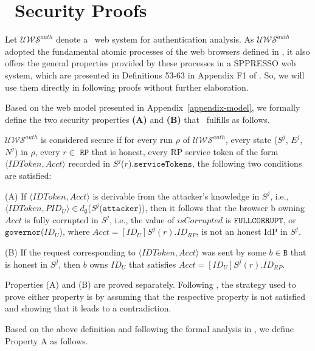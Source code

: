 \section{\usso\ Security Proofs}
\label{appendix-security}

Let  $\mathcal{UWS}^{auth}$ denote a \usso\ web system for authentication analysis. As $\mathcal{UWS}^{auth}$ adopted the fundamental atomic processes of the web browsers defined in \cite{SPRESSO}, it also offers the general properties provided by these processes in a SPPRESSO web system, which are presented in Definitions 53-63 in Appendix F1 of \cite{SPRESSO}. So, we will use them directly in following proofs without further elaboration.

Based on the web model presented in Appendix~\ref{appendix-model}, we formally define the two security properties {\bf (A)} and {\bf (B)} that \usso\ fulfills as follows. 

\begin{definition}
$\mathcal{UWS}^{auth}$ is considered secure if for every run $\rho$ of $\mathcal{UWS}^{auth}$, every state ($S^j$, $E^j$, $N^j$) in $\rho$, every $r \in$ $\mathtt{RP}$ that is honest, every RP service token of the form $\langle IDToken, Acct \rangle$ recorded in $S^j$($r$).$\mathtt{serviceTokens}$, the following two conditions are satisfied:

(A) If $\langle IDToken, Acct\rangle$ is derivable from the attacker's knowledge in $S^j$, i.e., $\langle IDToken, PID_U \rangle \in d_{\emptyset}$($S^j$($\mathtt{attacker}$)), then it follows that the browser b owning $Acct$ is fully corrupted in $S^j$, i.e., the value of $isCorrupted$ is $\mathtt{FULLCORRUPT}$, or $\mathtt{governor}$($ID_U$), where $Acct=[ID_U]S^j(r).ID_{RP}$, is not an honest IdP in $S^j$.

(B) If the request corresponding to $\langle IDToken, Acct \rangle$ was sent by some $b \in \mathtt{B}$ that is honest in $S^j$, then $b$ owns $ID_U$ that satisfies $Acct=[ID_U]S^j(r).ID_{RP}$.
\end{definition}

Properties (A) and (B) are proved separately. Following \cite{SPRESSO}, the strategy used to prove either property is by assuming that the respective property is not satisfied and showing that it leads to a contradiction.

\vspace{1mm} Based on the above definition and following the formal analysis in \cite{SPRESSO}, we define Property A as follows.

